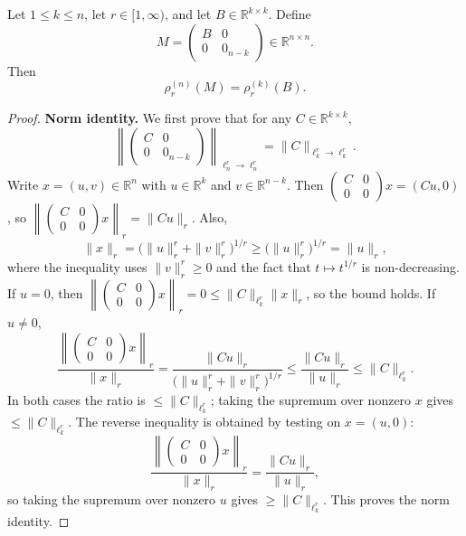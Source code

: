 \begin{theorem}\label{thm:padding}
Let $1\le k\le n$, let $r\in[1,\infty)$, and let $B\in\mathbb{R}^{k\times k}$. Define
\[
M=\begin{pmatrix}B&0\\0&0_{n-k}\end{pmatrix}\in\mathbb{R}^{n\times n}.
\]
Then
\[
\rho_r^{(n)}(M)=\rho_r^{(k)}(B).
\]
\end{theorem}

\begin{proof}
\textbf{Norm identity.}
We first prove that for any $C\in\mathbb{R}^{k\times k}$,
\[
\left\|\begin{pmatrix}C&0\\0&0_{n-k}\end{pmatrix}\right\|_{\ell^r_n\to\ell^r_n}
=\|C\|_{\ell^r_k\to\ell^r_k}.
\]
Write $x=(u,v)\in\mathbb{R}^n$ with $u\in\mathbb{R}^k$ and $v\in\mathbb{R}^{n-k}$. Then
$\begin{pmatrix}C&0\\0&0\end{pmatrix}x=(Cu,0)$,
so $\left\|\begin{pmatrix}C&0\\0&0\end{pmatrix}x\right\|_r=\|Cu\|_r$.
Also,
\[
\|x\|_r=\bigl(\|u\|_r^r+\|v\|_r^r\bigr)^{1/r}
\ge \bigl(\|u\|_r^r\bigr)^{1/r}=\|u\|_r,
\]
where the inequality uses $\|v\|_r^r\ge0$ and the fact that $t\mapsto t^{1/r}$ is non-decreasing.
If $u=0$, then $\left\|\begin{pmatrix}C&0\\0&0\end{pmatrix}x\right\|_r=0\le\|C\|_{\ell^r_k}\|x\|_r$, so the bound holds. If $u\ne0$,
\[
\frac{\left\|\begin{pmatrix}C&0\\0&0\end{pmatrix}x\right\|_r}{\|x\|_r}
=\frac{\|Cu\|_r}{\bigl(\|u\|_r^r+\|v\|_r^r\bigr)^{1/r}}
\le \frac{\|Cu\|_r}{\|u\|_r}
\le \|C\|_{\ell^r_k}.
\]
In both cases the ratio is $\le\|C\|_{\ell^r_k}$; taking the supremum over nonzero $x$ gives $\le\|C\|_{\ell^r_k}$.
The reverse inequality is obtained by testing on $x=(u,0)$:
\[
\frac{\left\|\begin{pmatrix}C&0\\0&0\end{pmatrix}x\right\|_r}{\|x\|_r}
=\frac{\|Cu\|_r}{\|u\|_r},
\]
so taking the supremum over nonzero $u$ gives $\ge\|C\|_{\ell^r_k}$. This proves the norm identity.


\end{proof}
